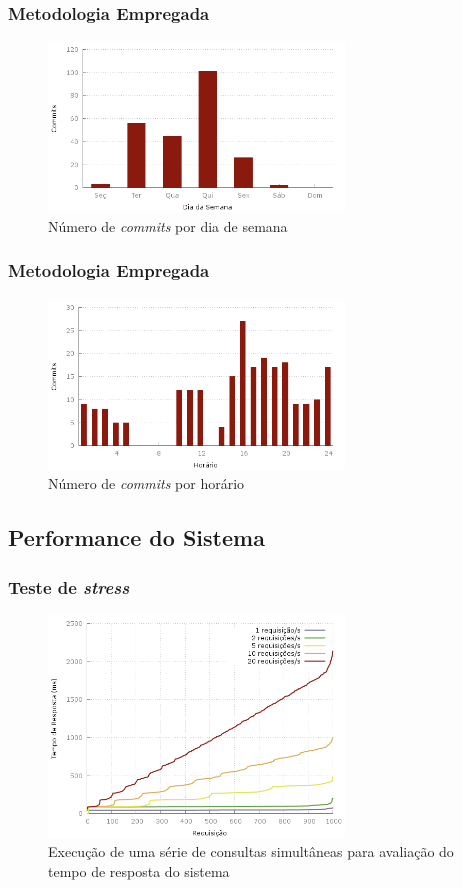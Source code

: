 \frame
{
\frametitle{Metodologia Empregada}
\begin{figure}
\includegraphics[width=0.7\textwidth]{./imgs/day_of_week.png}
\caption{Número de \emph{commits} por dia de semana}
\end{figure}


}

\frame
{
\frametitle{Metodologia Empregada}
\begin{figure}
\includegraphics[width=0.7\textwidth]{./imgs/hour_of_day.png}
\caption{Número de \emph{commits} por horário}
\end{figure}
}

\subsection{Performance do Sistema}
\frame
{
\frametitle{Teste de \emph{stress}}
\begin{figure}
\includegraphics[width=0.7\textwidth]{./imgs/out.png}
\caption{Execução de uma série de consultas simultâneas para avaliação do tempo de resposta do sistema}
\end{figure}
}